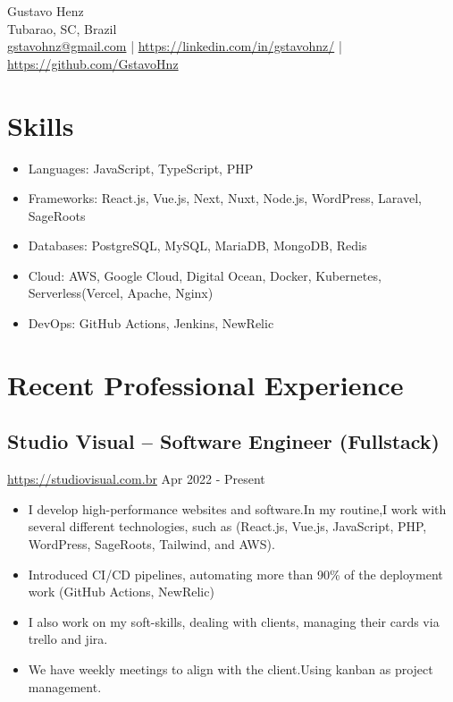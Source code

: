 \documentclass[11pt, a4paper]{article}
\begin{document}
\begin{center}
    {\Huge Gustavo Henz}\\
    \vspace{0.2cm}
    Tubarao, SC, Brazil\\
    \href{mailto:gstavohnz@gmail.com}{gstavohnz@gmail.com} | \href{https://www.linkedin.com/in/gstavohnz/}{https://linkedin.com/in/gstavohnz/} | \href{https://www.github.com/GstavoHnz}{https://github.com/GstavoHnz}
\end{center}

\section*{Skills}
\begin{itemize}[noitemsep]
    \item Languages: JavaScript, TypeScript, PHP
    \item Frameworks: React.js, Vue.js, Next, Nuxt, Node.js, WordPress, Laravel, SageRoots
    \item Databases: PostgreSQL, MySQL, MariaDB, MongoDB, Redis
    \item Cloud: AWS, Google Cloud, Digital Ocean, Docker, Kubernetes, Serverless(Vercel, Apache, Nginx)
    \item DevOps: GitHub Actions, Jenkins, NewRelic
\end{itemize}

\section*{Recent Professional Experience}
\subsection*{Studio Visual -- Software Engineer (Fullstack)}
\href{https://www.studiovisual.com.br}{https://studiovisual.com.br} \hfill Apr 2022 - Present
\begin{itemize}[noitemsep]
    \item I develop high-performance websites and software.In my routine,I work with several different technologies, such as (React.js, Vue.js, JavaScript, PHP, WordPress, SageRoots, Tailwind, and AWS).
    \item Introduced CI/CD pipelines, automating more than 90\% of the deployment work (GitHub Actions, NewRelic)
    \item I also work on my soft-skills, dealing with clients, managing their cards via trello and jira.
    \item We have weekly meetings to align with the client.Using kanban as project management.
\end{itemize}
\end{document}
